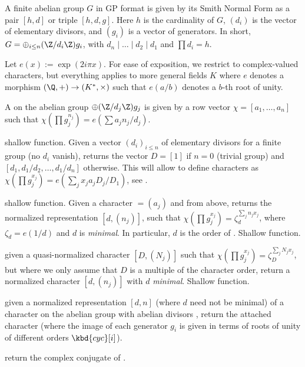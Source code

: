 
A finite abelian group $G$ in GP format is given by its Smith
Normal Form as a pair $[h,d]$ or triple $[h,d,g]$.
Here $h$ is the cardinality of $G$, $(d_i)$ is the vector of elementary
divisors, and $(g_i)$ is a vector of generators. In short,
$G = \oplus_{i\leq n} (\Z/d_i\Z) g_i$, with $d_n \mid \dots \mid d_2 \mid d_1$
and $\prod d_i = h$.

Let $e(x) := \exp(2i\pi x)$. For ease of exposition, we restrict to
complex-valued characters, but everything applies to more general fields $K$
where $e$ denotes a morphism $(\Q,+) \to (K^*,\times)$ such that $e(a/b)$
denotes a $b$-th root of unity.

A  on the abelian group $\oplus (\Z/d_j\Z) g_j$
is given by a row vector $\chi = [a_1,\ldots,a_n]$ such that
$\chi(\prod g_j^{n_j}) = e(\sum a_j n_j / d_j)$.

 shallow function. Given a vector
$(d_i)_{i \leq n}$
of elementary divisors for a finite group (no $d_i$ vanish), returns the vector
$D = [1]$ if $n = 0$ (trivial group) and
 $[d_1, d_1/d_2, \dots, d_1/d_n]$ otherwise. This will allow to define
characters as $\chi(\prod g_j^{x_j}) = e(\sum_j x_j a_j D_j / D_1)$,
see .

 shallow function. Given a
character  $ = (a_j)$ and  from 
above, returns the normalized representation $[d, (n_j)]$, such that
$\chi(\prod g_j^{x_j}) = \zeta_d^{\sum_j n_j x_j}$, where $\zeta_d =
e(1/d)$ and $d$ is \emph{minimal}. In particular, $d$ is the order
of . Shallow function.

 given a quasi-normalized character
$[D, (N_j)]$ such that $\chi(\prod g_j^{x_j}) = \zeta_D^{\sum_j N_j x_j}$,
but where we only  assume that $D$ is a multiple of the character
order, return a normalized character $[d, (n_j)]$ with $d$ \emph{minimal}.
Shallow function.

 given a normalized
representation $[d, n]$ (where $d$ need not be minimal) of a character on the
abelian group with abelian divisors , return the attached character
(where the image of each generator $g_i$ is given in terms of roots
of unity of different orders $\kbd{cyc}[i]$).

 return the complex conjugate of
.

